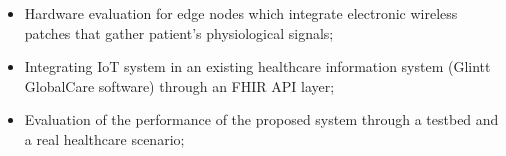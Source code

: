 
\begin{itemize}
    \item Hardware evaluation for edge nodes which integrate electronic wireless patches that gather patient's physiological signals;
    \item Integrating IoT system in an existing healthcare information system  (Glintt GlobalCare software) through an FHIR API layer;
    \item Evaluation of the performance of the proposed system through a testbed and a real healthcare scenario;
\end{itemize}
